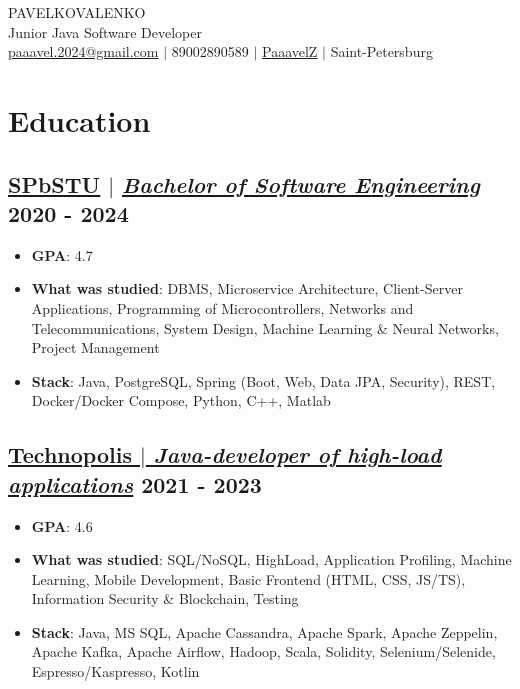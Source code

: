\documentclass[11pt]{article}
\begin{document}
\begin{center}
    {\fontsize{36}{36}\selectfont\interthin PAVEL\interheavy KOVALENKO} \\ \bigskip
    {\fontsize{25}{25}\selectfont\interthin Junior Java Software Developer} \\ \bigskip
    {\color{icnclr}\faEnvelope[regular]} \href{mailto:paaavel.2024@gmail.com}{paaavel.2024@gmail.com} $|$ 
    {\color{icnclr}} 89002890589 $|$
    {\color{icnclr}\faGithub} \href{https://github.com/PaaavelZ}{PaaavelZ} $|$
    {\color{icnclr}\faMapMarker} Saint-Petersburg
\end{center}

\section{Education}
\subsection{\href{https://www.spbstu.ru/}{\underline{SPbSTU}} $|$ {\normalfont\textit{\href{https://www.spbstu.ru/structure/graduate_school_software_engineering/}{\underline{Bachelor of Software Engineering}}}} \hfill 2020 - 2024}
\begin{itemize}
    \item \textbf{GPA}: 4.7
    \item \textbf{What was studied}: DBMS, Microservice Architecture, Client-Server Applications, Programming of Microcontrollers, Networks and Telecommunications, System Design, Machine Learning \& Neural Networks, Project Management
    \item \textbf{Stack}: Java, PostgreSQL, Spring (Boot, Web, Data JPA, Security), REST, Docker/Docker Compose, Python, C++, Matlab
\end{itemize}

\subsection{\href{https://polis.vk.company/}{\underline{Technopolis} $|$ {\normalfont\textit{\underline{Java-developer of high-load applications}}}} \hfill 2021 - 2023}
\begin{itemize}
    \item \textbf{GPA}: 4.6
    \item \textbf{What was studied}: SQL/NoSQL, HighLoad, Application Profiling, Machine Learning, Mobile Development, Basic Frontend (HTML, CSS, JS/TS), Information Security \& Blockchain, Testing
    \item \textbf{Stack}: Java, MS SQL, Apache Cassandra, Apache Spark, Apache Zeppelin, Apache Kafka, Apache Airflow, Hadoop, Scala, Solidity, Selenium/Selenide, Espresso/Kaspresso, Kotlin
\end{itemize}
\end{document}
